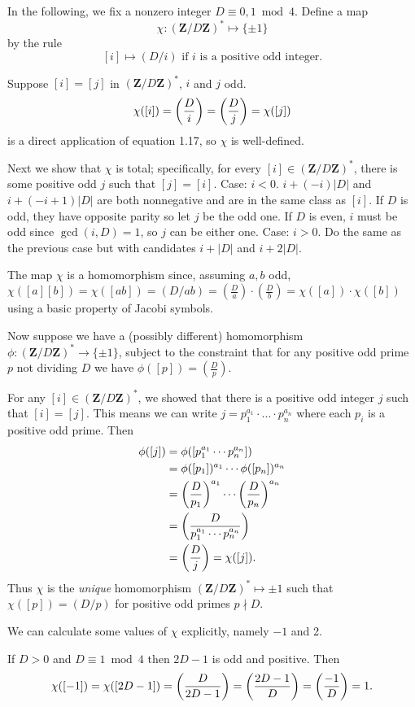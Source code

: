 In the following, we fix a nonzero integer $D\equiv 0, 1\bmod 4$. Define a map
\[\chi:(\mathbf{Z}/D\mathbf{Z})^* \mapsto \{\pm 1\}\]
by the rule
\[[i]\mapsto(D/i)\text{ if $i$ is a positive odd integer.}\]

Suppose $[i] = [j]$ in $(\mathbf{Z}/D\mathbf{Z})^*$, $i$ and $j$ odd.
\[\chi([i])=\left(\frac{D}{i}\right)=\left(\frac{D}{j}\right)=\chi([j])\]
is a direct application of equation 1.17, so $\chi$ is well-defined.

Next we show that $\chi$ is total; specifically, for every $[i]\in (\mathbf{Z}/D\mathbf{Z})^*$, there is some positive odd $j$ such that $[j] = [i]$.
  Case: $i < 0$. $i+(-i)|D|$ and $i+(-i+1)|D|$ are both nonnegative and are in the same class as $[i]$. If $D$ is odd, they have opposite parity so let $j$ be the odd one. If $D$ is even, $i$ must be odd since $\gcd(i,D)=1$, so $j$ can be either one.
  Case: $i > 0$. Do the same as the previous case but with candidates $i+|D|$ and $i+2|D|$.

The map $\chi$ is a homomorphism since, assuming $a,b$ odd, $\chi([a][b]) = \chi([ab]) = (D/ab) = (\frac{D}{a})\cdot(\frac{D}{b}) = \chi([a])\cdot\chi([b])$ using a basic property of Jacobi symbols.

Now suppose we have a (possibly different) homomorphism
$\phi:(\mathbf{Z}/D\mathbf{Z})^*\to\{\pm 1\}$, subject to the constraint that for any positive odd prime $p$ not dividing $D$ we have
  $\phi([p]) = (\frac{D}{p})$.

For any $[i]\in (\mathbf{Z}/D\mathbf{Z})^*$, we showed that there is a positive odd integer $j$ such that $[i] = [j]$. This means we can write $j=p_1^{a_1}\cdot\ldots\cdot p_n^{a_n}$ where each $p_i$ is a positive odd prime. Then
\begin{align*}
\phi([j]) &= \phi([p_1^{a_1}\cdots p_n^{a_n}])\\
       &= \phi([p_1])^{a_1}\cdots \phi([p_n])^{a_n}\\
       &= \left(\frac{D}{p_1}\right)^{a_1}\cdots\left(\frac{D}{p_n}\right)^{a_n}\\
       &= \left(\frac{D}{p_1^{a_1}\cdots p_n^{a_n}}\right)\\
       &= \left(\frac{D}{j}\right) = \chi([j]).
\end{align*}
Thus $\chi$ is the \emph{unique} homomorphism
$(\mathbf{Z}/D\mathbf{Z})^* \mapsto {\pm 1}$
such that $\chi([p]) = (D/p)$ for positive odd primes $p\nmid D$.

We can calculate some values of $\chi$ explicitly, namely $-1$ and 2.

If $D>0$ and $D\equiv 1\bmod 4$ then $2D-1$ is odd and positive. Then
\[\chi([-1])=\chi([2D-1])=\left(\frac{D}{2D-1}\right)=\left(\frac{2D-1}{D}\right)=\left(\frac{-1}{D}\right)=1.\]


